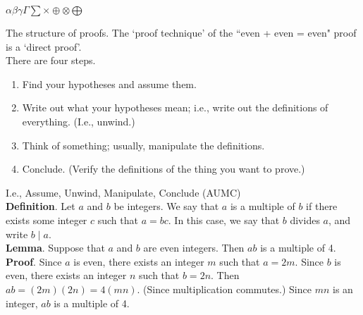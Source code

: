 \documentclass{article}
\begin{document}
$\alpha \beta \gamma \Gamma \sum \times \oplus \otimes \bigoplus$


\newpage

The structure of proofs. The `proof technique' of the ``even + even = even" proof is a `direct proof'. 
\\

There are four steps.
\begin{enumerate}
    \item Find your hypotheses and assume them.
    \item Write out what your hypotheses mean; i.e., write out the definitions of everything. (I.e., unwind.)
    \item Think of something; usually, manipulate the definitions.
    \item Conclude. (Verify the definitions of the thing you want to prove.)
\end{enumerate}
I.e., Assume, Unwind, Manipulate, Conclude (AUMC)
\\

\textbf{Definition}. Let $a$ and $b$ be integers. We say that $a$ is a multiple of $b$ if there exists some integer $c$ such that $a = bc$. In this case, we say that $b$ divides $a$, and write $b \mid a$.
\\

\textbf{Lemma}. Suppose that $a$ and $b$ are even integers. Then $ab$ is a multiple of 4.
\\

\textbf{Proof}.  Since $a$ is even, there exists an integer $m$ such that $a = 2m$. Since $b$ is even, there exists an integer $n$ such that $b = 2n$. Then $ab = (2m)(2n) = 4(mn)$. (Since multiplication commutes.) Since $mn$ is an integer, $ab$ is a multiple of 4.
\end{document}
